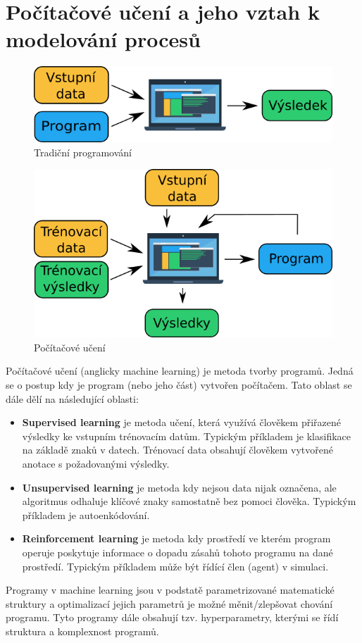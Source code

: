 \section{Počítačové učení a jeho vztah k modelování procesů}
\label{sec:ML}
\begin{figure}[h] \centering \capstart
  \includegraphics[scale=0.6]{figures/traditional_prog_cz}
  \caption{Tradiční programování}
  \label{fig:traditional_prog}
\end{figure}

\begin{figure}[h] \centering \capstart
  \includegraphics[scale=0.6]{figures/machine_learning_cz}
  \caption{Počítačové učení}
  \label{fig:machine_learning}
\end{figure}
Počítačové učení (anglicky machine learning) je metoda tvorby programů. Jedná
se o postup kdy je program (nebo jeho část) vytvořen počítačem. Tato oblast se
dále dělí na následující oblasti:
\begin{itemize}
  \item
    \textbf{Supervised learning} je metoda učení, která využívá člověkem
    přiřazené výsledky ke vstupním trénovacím datům. Typickým příkladem je
    klasifikace na základě znaků v datech. Trénovací data obsahují člověkem
    vytvořené anotace s požadovanými výsledky.
  \item
    \textbf{Unsupervised learning} je metoda kdy nejsou data nijak označena,
    ale algoritmus odhaluje klíčové znaky samostatně bez pomoci člověka.
    Typickým příkladem je autoenkódování.
  \item
    \textbf{Reinforcement learning} je metoda kdy prostředí ve kterém program
    operuje poskytuje informace o dopadu zásahů tohoto programu na dané
    prostředí. Typickým příkladem může být řídící člen (agent) v simulaci.
\end{itemize}
Programy v machine learning jsou v podstatě
parametrizované matematické struktury a optimalizací jejich parametrů je možné
měnit/zlepšovat chování programu. Tyto programy dále obsahují tzv.
hyperparametry, kterými se řídí struktura a komplexnost programů.

